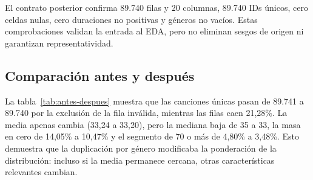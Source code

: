 El contrato posterior confirma 89.740 filas y 20 columnas, 89.740 IDs únicos, cero celdas nulas,
cero duraciones no positivas y géneros no vacíos. Estas comprobaciones validan la entrada al EDA,
pero no eliminan sesgos de origen ni garantizan representatividad.

\subsection{Comparación antes y después}

\begin{table}[H]
\centering
\caption{Impacto cuantitativo de consolidar . Tabla generada por
.}
\label{tab:antes-despues}
\resizebox{\textwidth}{!}{}
\end{table}

La tabla~\ref{tab:antes-despues} muestra que las canciones únicas pasan de 89.741 a 89.740 por la
exclusión de la fila inválida, mientras las filas caen 21,28\%. La media apenas cambia (33,24 a
33,20), pero la mediana baja de 35 a 33, la masa en cero de 14,05\% a 10,47\% y el segmento de 70 o
más de 4,80\% a 3,48\%. Esto demuestra que la duplicación por género modificaba la ponderación de
la distribución: incluso si la media permanece cercana, otras características relevantes cambian.
